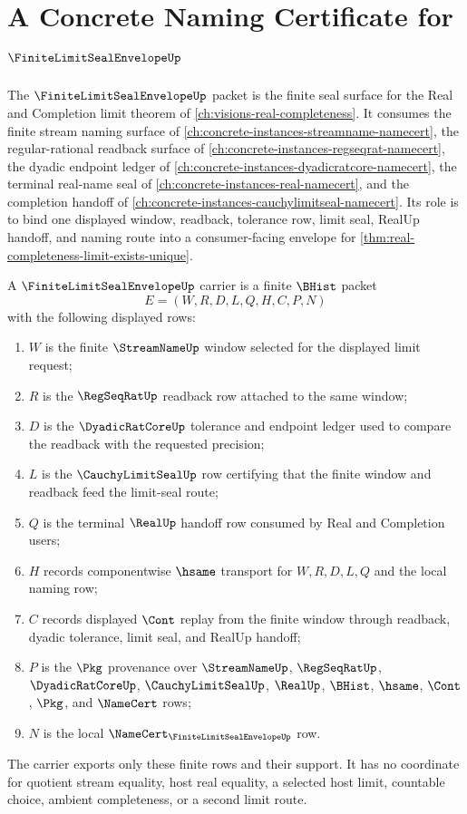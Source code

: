 \chapter{A Concrete Naming Certificate for $\FiniteLimitSealEnvelopeUp$}
\label{ch:concrete-instances-finite-limit-seal-envelope-namecert}

The $\FiniteLimitSealEnvelopeUp$ packet is the finite seal surface for the Real and Completion limit theorem of \autoref{ch:visions-real-completeness}. It consumes the finite stream naming surface of \autoref{ch:concrete-instances-streamname-namecert}, the regular-rational readback surface of \autoref{ch:concrete-instances-regseqrat-namecert}, the dyadic endpoint ledger of \autoref{ch:concrete-instances-dyadicratcore-namecert}, the terminal real-name seal of \autoref{ch:concrete-instances-real-namecert}, and the completion handoff of \autoref{ch:concrete-instances-cauchylimitseal-namecert}. Its role is to bind one displayed window, readback, tolerance row, limit seal, RealUp handoff, and naming route into a consumer-facing envelope for \autoref{thm:real-completeness-limit-exists-unique}.

\begin{definition}
\label{def:finite-limit-seal-envelope-carrier}
A $\FiniteLimitSealEnvelopeUp$ carrier is a finite $\BHist$ packet
$$
E=(W,R,D,L,Q,H,C,P,N)
$$
with the following displayed rows:
\begin{enumerate}
\item $W$ is the finite $\StreamNameUp$ window selected for the displayed limit request;
\item $R$ is the $\RegSeqRatUp$ readback row attached to the same window;
\item $D$ is the $\DyadicRatCoreUp$ tolerance and endpoint ledger used to compare the readback with the requested precision;
\item $L$ is the $\CauchyLimitSealUp$ row certifying that the finite window and readback feed the limit-seal route;
\item $Q$ is the terminal $\RealUp$ handoff row consumed by Real and Completion users;
\item $H$ records componentwise $\hsame$ transport for $W,R,D,L,Q$ and the local naming row;
\item $C$ records displayed $\Cont$ replay from the finite window through readback, dyadic tolerance, limit seal, and RealUp handoff;
\item $P$ is the $\Pkg$ provenance over $\StreamNameUp$, $\RegSeqRatUp$, $\DyadicRatCoreUp$, $\CauchyLimitSealUp$, $\RealUp$, $\BHist$, $\hsame$, $\Cont$, $\Pkg$, and $\NameCert$ rows;
\item $N$ is the local $\NameCert_{\FiniteLimitSealEnvelopeUp}$ row.
\end{enumerate}
The carrier exports only these finite rows and their support. It has no coordinate for quotient stream equality, host real equality, a selected host limit, countable choice, ambient completeness, or a second limit route.
\end{definition}

